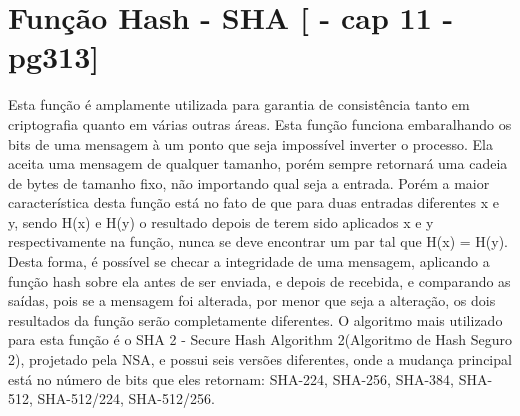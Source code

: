 \documentclass{article}
\begin{document}
	\section{Função Hash - SHA [\cite{STALLINS} - cap 11 - pg313]}
		\begin{flushleft}
			\begin{large}

    		\hspace{2cm} Esta função é amplamente utilizada para garantia de consistência tanto em criptografia quanto em várias outras áreas. Esta função funciona embaralhando os bits de uma mensagem à um ponto que seja impossível inverter o processo. Ela aceita uma mensagem de qualquer tamanho, porém sempre retornará uma cadeia de bytes de tamanho fixo, não importando qual seja a entrada. Porém a maior característica desta função está no fato de que para duas entradas diferentes x e y, sendo H(x) e H(y) o resultado depois de terem sido aplicados x e y respectivamente na função, nunca se deve encontrar um par tal que H(x) = H(y). Desta forma, é possível se checar a integridade de uma mensagem, aplicando a função hash sobre ela antes de ser enviada, e depois de recebida, e comparando as saídas, pois se a mensagem foi alterada, por menor que seja a alteração, os dois resultados da função serão completamente diferentes. O algoritmo mais utilizado para esta função é o SHA 2 - Secure Hash Algorithm 2(Algoritmo de Hash Seguro 2), projetado pela NSA, e possui seis versões diferentes, onde a mudança principal está no número de bits que eles retornam: SHA-224, SHA-256, SHA-384, SHA-512, SHA-512/224, SHA-512/256. 
			\end{large}
		\end{flushleft}
\end{document}
